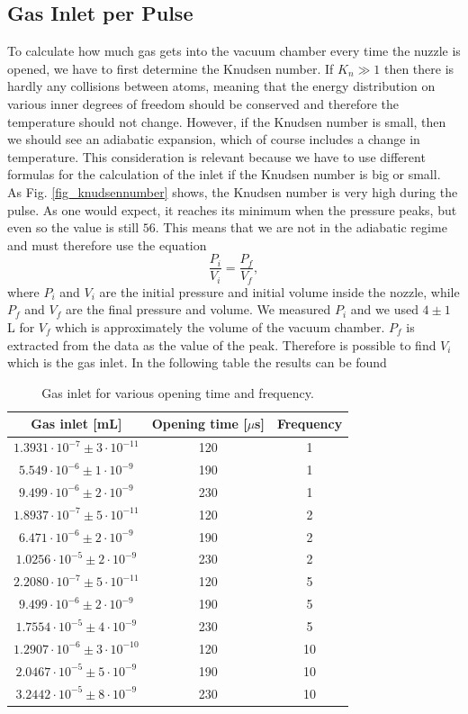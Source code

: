 \documentclass[a4paper,10pt]{article}
\begin{document}
\subsection{Gas Inlet per Pulse}
To calculate how much gas gets into the vacuum chamber every time the nuzzle is opened, we have to first determine the Knudsen number. If $K_n \gg 1$ then there is hardly any collisions between atoms, meaning that the energy distribution on various inner degrees of freedom should be conserved and therefore the temperature should not change. However, if the Knudsen number is small, then we should see an adiabatic expansion, which of course includes a change in temperature. This consideration is relevant because we have to use different formulas for the calculation of the inlet if the Knudsen number is big or small. 
\\
As Fig. \ref{fig_knudsennumber} shows, the Knudsen number is very high during the pulse. As one would expect, it reaches its minimum when the pressure peaks, but even so the value is still $56$. %
This means that we are not in the adiabatic regime and must therefore use the equation 
\begin{equation}
	\frac{P_i}{V_i} = \frac{P_f}{V_f},
\end{equation}
where $P_i$ and $V_i$ are the initial pressure and initial volume inside the nozzle, while $P_f$ and $V_f$ are the final pressure and volume. We measured $P_i$ and we used $4\pm 1$ L for $V_f$ which is approximately the volume of the vacuum chamber. $P_f$ is extracted from the data as the value of the peak. Therefore is possible to find $V_i$ which is the gas inlet. In the following table the results can be found
\begin{table}[H]
\centering
\begin{tabular}{ccc} \toprule
    Gas inlet [mL] & Opening time [$\mu$s] & Frequency \\ \midrule
$1.3931\cdot 10^{-7} \pm 3\cdot 10^{-11}$& 120& 1\\
$5.549\cdot 10^{-6} \pm 1\cdot 10^{-9}$& 190& 1\\
$9.499\cdot 10^{-6} \pm 2\cdot 10^{-9}$& 230& 1\\\midrule
$1.8937\cdot 10^{-7} \pm 5\cdot 10^{-11}$& 120& 2\\
$6.471\cdot 10^{-6} \pm 2\cdot 10^{-9}$& 190& 2\\
$1.0256\cdot 10^{-5} \pm 2\cdot 10^{-9}$& 230& 2\\ \midrule
$2.2080\cdot 10^{-7} \pm 5\cdot 10^{-11}$& 120& 5\\
$9.499\cdot 10^{-6} \pm 2\cdot 10^{-9}$ & 190& 5\\ 
$1.7554\cdot 10^{-5} \pm 4\cdot 10^{-9}$ & 230& 5\\\midrule
$1.2907\cdot 10^{-6} \pm 3\cdot 10^{-10}$& 120& 10\\ 
$2.0467\cdot 10^{-5} \pm 5\cdot 10^{-9}$ & 190& 10\\
$3.2442\cdot 10^{-5} \pm 8\cdot 10^{-9}$ & 230& 10\\ \bottomrule
\end{tabular}
\caption{Gas inlet for various opening time and frequency. }
\end{table}
\end{document}
